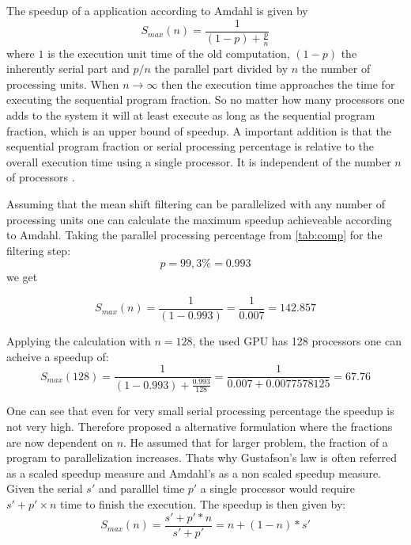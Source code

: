 The speedup of a application according to Amdahl is given by
\begin{equation}\label{eq:amdahl} 
	S_{max}(n) = \frac{1}{(1-p) + \frac{p}{n}}
\end{equation} 
where $1$ is the execution unit time of the old computation, $(1-p)$ the
inherently serial part and $p/n$ the parallel part divided by $n$ the
number of processing units. When $n \rightarrow \infty$ then the execution time
approaches the time for executing the sequential program fraction. So no matter
how many processors one adds to the system it will at least execute as long as
the sequential program fraction, which is an upper bound of speedup. A important
addition is that the sequential program fraction or serial processing percentage
is relative to the overall execution time using a single processor. It is 
independent of the number $n$ of processors \citeauthor{citeulike:3838998} 
\citep{citeulike:3838998}. 


Assuming that the mean shift filtering can be parallelized with any number of
processing units one can calculate the maximum speedup achieveable according
to Amdahl. Taking the parallel processing percentage from \autoref{tab:comp} for 
the filtering step: 
\begin{equation*}\label{eq:parallel}
	p = 99,3\% = 0.993 
\end{equation*}
we get

\begin{equation*}\label{eq:am0}
	S_{max}(n) = \frac{1}{(1-0.993)} = \frac{1}{0.007} = 142.857	
\end{equation*}

Applying the calculation with $n = 128$, the used \gls{GPU} has 128 processors one
can acheive a speedup of:
\begin{equation*}\label{eq:g92sp}
		S_{max}(128) = \frac{1}{(1-0.993) + \frac{0.993}{128}} = \frac{1}{0.007 + 0.0077578125} = 67.76
\end{equation*}

One can see that even for very small serial processing percentage the speedup is
not very high. Therefore \citeauthor{citeulike:3732921} proposed a alternative
formulation where the fractions are now dependent on $n$. He assumed that for 
larger problem, the fraction of a program to parallelization increases. Thats
why Gustafson's law is often referred as a scaled speedup measure
and Amdahl's as a non scaled speedup measure. Given the serial $s'$ and paralllel 
time $p'$ a single processor would require $s' + p' \times n$ time to finish the execution.
The speedup is then given by:
\begin{equation}\label{eq:gus}
	S_{max}(n) = \frac{s' + p' * n}{s' + p'} = n + ( 1 - n ) * s'
\end{equation}

